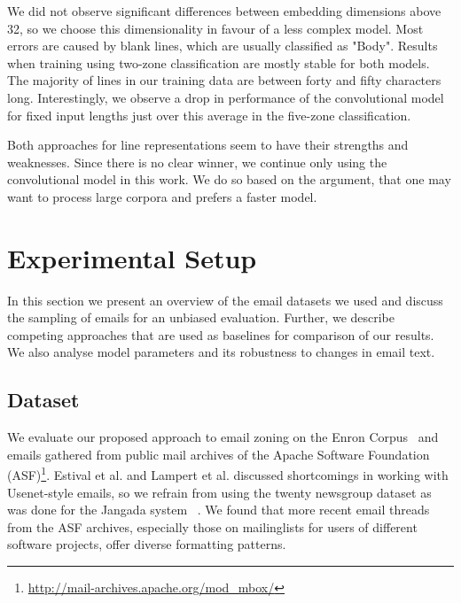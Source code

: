 \documentclass{llncs}
\begin{document}
We did not observe significant differences between embedding dimensions above 32, so we choose this dimensionality in favour of a less complex model.
Most errors are caused by blank lines, which are usually classified as "Body".
Results when training using two-zone classification are mostly stable for both models.
The majority of lines in our training data are between forty and fifty characters long.
Interestingly, we observe a drop in performance of the convolutional model for fixed input lengths just over this average in the five-zone classification.

Both approaches for line representations seem to have their strengths and weaknesses.
Since there is no clear winner, we continue only using the convolutional model in this work.
We do so based on the argument, that one may want to process large corpora and prefers a faster model.




\section{Experimental Setup}
In this section we present an overview of the email datasets we used and discuss the sampling of emails for an unbiased evaluation.
Further, we describe competing approaches that are used as baselines for comparison of our results.
We also analyse model parameters and its robustness to changes in email text.

\subsection{Dataset}
We evaluate our proposed approach to email zoning on the Enron Corpus~\cite{enron} and emails gathered from public mail archives of the Apache Software Foundation (ASF)\footnote{\url{http://mail-archives.apache.org/mod\_mbox/}}. 
Estival et al. and Lampert et al. discussed shortcomings in working with Usenet-style emails, so we refrain from using the twenty newsgroup dataset as was done for the Jangada system ~\cite{profiling,zones,20news}.
We found that more recent email threads from the ASF archives, especially those on mailinglists for users of different software projects, offer diverse formatting patterns.
\end{document}
